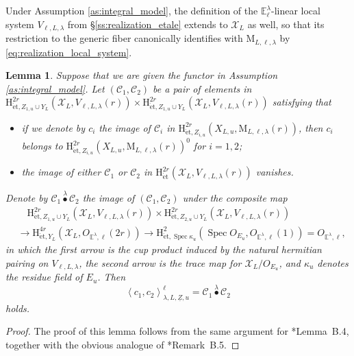 \documentclass[12pt]{amsart}
\numberwithin{equation}{section}
\theoremstyle{plain}
\newtheorem{lem}[proposition]{Lemma}
\theoremstyle{definition}
\theoremstyle{remark}
\renewcommand{\c}[1]{\mathcal{#1}}
\renewcommand{\d}[1]{\mathbb{#1}}
\renewcommand{\r}[1]{\mathrm{#1}}
\renewcommand{\(}{\left(}
\renewcommand{\)}{\right)}
\newcommand{\ul}{\underline}
\newcommand{\cC}{\c C}
\newcommand{\cX}{\c X}
\newcommand{\dE}{\d E}
\newcommand{\rH}{\r H}
\newcommand{\rM}{\r M}
\newcommand{\llangle}{\left\langle}
\newcommand{\rrangle}{\right\rangle}
\newcommand{\et}{{\acute{\r{e}}\r{t}}}
\DeclareMathOperator{\Spec}{Spec}
\begin{document}
Under Assumption \ref{as:integral_model}, the definition of the $\dE^\lambda_\ell$-linear local system $V_{\ell,L,\lambda}$ from \S\ref{ss:realization_etale} extends to $\cX_L$ as well, so that its restriction to the generic fiber canonically identifies with $\rM_{L,\ell,\lambda}$ by \eqref{eq:realization_local_system}.



\begin{lem}\label{le:height_integral}
Suppose that we are given the functor in Assumption \ref{as:integral_model}. Let $(\cC_1,\cC_2)$ be a pair of elements in $\rH^{2r}_{\et,Z_{1,u}\cup Y_L}(\cX_L,V_{\ell,L,\lambda}(r))\times\rH^{2r}_{\et,Z_{1,u}\cup Y_L}(\cX_L,V_{\ell,L,\lambda}(r))$ satisfying that
\begin{itemize}
  \item if we denote by $c_i$ the image of $\cC_i$ in $\rH^{2r}_{\et,Z_{i,u}}(X_{L,u},\rM_{L,\ell,\lambda}(r))$, then $c_i$ belongs to $\rH^{2r}_{\et,Z_{i,u}}(X_{L,u},\rM_{L,\ell,\lambda}(r))^0$ for $i=1,2$;

  \item the image of either $\cC_1$ or $\cC_2$ in $\rH^{2r}_{\et}(\cX_L,V_{\ell,L,\lambda}(r))$ vanishes.
\end{itemize}
Denote by $\cC_1\overset{\lambda}\bullet\cC_2$ the image of $(\cC_1,\cC_2)$ under the composite map
\begin{align*}
&\quad\rH^{2r}_{\et,Z_{1,u}\cup Y_L}(\cX_L,V_{\ell,L,\lambda}(r))
\times\rH^{2r}_{\et,Z_{2,u}\cup Y_L}(\cX_L,V_{\ell,L,\lambda}(r))  \\ &\to\rH^{4r}_{\et,Y_L}(\cX_L,O_{\dE^\lambda,\ell}(2r))
\to\rH^2_{\et,\Spec\kappa_u}(\Spec O_{E_u},O_{\dE^\lambda,\ell}(1))=O_{\dE^\lambda,\ell},
\end{align*}
in which the first arrow is the cup product induced by the natural hermitian pairing on $V_{\ell,L,\lambda}$, the second arrow is the trace map for $\cX_L/O_{E_u}$, and $\kappa_u$ denotes the residue field of $E_u$. Then
\[
\llangle c_1,c_2\rrangle_{\lambda,L,\ul{Z},u}^\ell=\cC_1\overset\lambda\bullet\cC_2
\]
holds.
\end{lem}

\begin{proof}
The proof of this lemma follows from the same argument for \cite{LL21}*{Lemma~B.4}, together with the obvious analogue of \cite{LL21}*{Remark~B.5}.
\end{proof}
\end{document}
